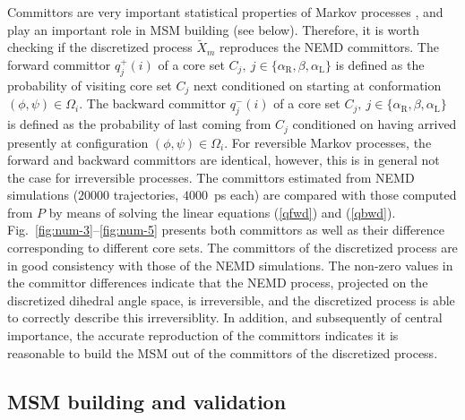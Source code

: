 \documentclass[journal=jctcce,manuscript=article]{achemso}
\newcommand{\fwd}[0]{+}
\newcommand{\bwd}[0]{-}
\newcommand{\confaa}[0]{{\alpha_{\textrm{R}}}}
\newcommand{\confc}[0]{{\alpha_{\textrm{L}}}}
\begin{document}
Committors are very important statistical properties of Markov processes \cite{PrinzHeldSmithNoe_Committorprep,PNAS09}, and play
an important role in MSM building \cite{A19-31,A19-29,djurdjevac2010markov} (see below). Therefore, it is worth
checking if the discretized process $\tilde X_m$ reproduces the NEMD committors.
The forward committor $q^\fwd_j(i)$ of a core set $C_j,\
j\in\{\confaa, \beta, \confc\}$ is defined as the probability of
visiting core set $C_j$ next conditioned on starting at conformation
$(\phi,\psi)\in\Omega_i$.  The backward committor $q^\bwd_j(i)$ of a
core set $C_j,\ j\in\{\confaa, \beta, \confc\}$ is defined as the
probability of last coming from $C_j$ conditioned on having arrived presently at
configuration $(\phi,\psi)\in\Omega_i$.
For reversible Markov processes, the
forward and backward committors are identical, however, this is in
general not the case for irreversible processes.
The committors estimated from NEMD simulations ($20000$ trajectories, $4000$~ps each) are compared with
those computed from $P$ by means of solving the linear equations (\ref{qfwd}) and (\ref{qbwd}).
Fig.~\ref{fig:num-3}--\ref{fig:num-5} presents both
committors as well as their difference corresponding to different core sets.
The committors of the discretized process are in good consistency with those of
the NEMD simulations. The non-zero values in the committor differences
indicate that the NEMD process, projected on the discretized
dihedral angle space, is irreversible, and
the discretized process is able to correctly describe this irreversiblity.
In addition, and subsequently of central importance, the accurate reproduction of the committors indicates it is reasonable to build the 
MSM out of the committors of the  discretized process.



\subsection{MSM building and validation}
\end{document}
